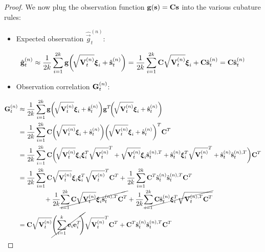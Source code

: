 \begin{proof}
		We now plug the observation function \( \boldsymbol{\mathrm{g}}(\boldsymbol{\mathrm{s}}) = \boldsymbol{\mathrm{C}} \boldsymbol{\mathrm{s}} \) into the various cubature rules:
		\begin{itemize}
			\item Expected observation \( \hat{\vec{g}}_t^{(n)} \):
		\end{itemize}
		\begin{align*}
			\hat{\boldsymbol{\mathrm{g}}}_t^{(n)}
				\approx \frac{1}{2k} \sum_{i = 1}^{2k} \boldsymbol{\mathrm{g}}\bigg(\!\sqrt{\boldsymbol{\mathrm{V}}_t^{(n)}} \boldsymbol{\mathrm{\xi}}_i + \hat{\boldsymbol{\mathrm{s}}}_t^{(n)}\bigg)
				= \frac{1}{2k} \sum_{i = 1}^{2k} \boldsymbol{\mathrm{C}} \sqrt{\boldsymbol{\mathrm{V}}_t^{(n)}} \boldsymbol{\mathrm{\xi}}_i + \boldsymbol{\mathrm{C}} \hat{\boldsymbol{\mathrm{s}}}_t^{(n)}
				= \boldsymbol{\mathrm{C}} \hat{\boldsymbol{\mathrm{s}}}_t^{(n)}
		\end{align*}
		\begin{itemize}
			\item Observation correlation \( \boldsymbol{\mathrm{G}}_t^{(n)} \):
		\end{itemize}
		\begin{align*}
			\mat{G}_t^{(n)}
				&\approx \frac{1}{2k} \sum_{i = 1}^{2k} \vec{g}\bigg(\! \sqrt{\mat{V}_t^{(n)}} \vec{\xi}_i + \hat{\vec{s}}_t^{(n)}\bigg) \vec{g}^T\!\bigg(\! \sqrt{\mat{V}_t^{(n)}} \vec{\xi}_i + \hat{\vec{s}}_t^{(n)} \bigg) \\
				&= \frac{1}{2k} \sum_{i = 1}^{2k} \mat{C} \bigg(\! \sqrt{\mat{V}_t^{(n)}} \vec{\xi}_i + \hat{\vec{s}}_t^{(n)}\bigg) \bigg(\! \sqrt{\mat{V}_t^{(n)}} \vec{\xi}_i + \hat{\vec{s}}_t^{(n)}\bigg)^T \mat{C}^T \\
				&= \frac{1}{2k} \sum_{i = 1}^{2k} \mat{C} \bigg(\! \sqrt{\mat{V}_t^{(n)}} \vec{\xi}_i \vec{\xi}_i^T \sqrt{\mat{V}_t^{(n)}}^T + \sqrt{\mat{V}_t^{(n)}} \vec{\xi}_i \hat{\vec{s}}_t^{(n), T} + \hat{\vec{s}}_t^{(n)} \vec{\xi}_i^T \sqrt{\mat{V}_t^{(n)}}^T + \hat{\vec{s}}_t^{(n)} \hat{\vec{s}}_t^{(n), T} \bigg) \mat{C}^T \\
				&= \frac{1}{2k} \sum_{i = 1}^{2k} \mat{C} \sqrt{\mat{V}_t^{(n)}} \vec{\xi}_i \vec{\xi}_i^T \sqrt{\mat{V}_t^{(n)}}^T \mat{C}^T + \frac{1}{2k} \sum_{i = 1}^{2k} \mat{C}^T \hat{\vec{s}}_t^{(n)} \hat{\vec{s}}_t^{(n), T} \mat{C}^T \\
					&\qquad\qquad + \frac{1}{2k} \cancel{\sum_{i = 1}^{2k} \mat{C} \sqrt{\mat{V}_t^{(n)}} \vec{\xi}_i \hat{\vec{s}}_t^{(n), T} \mat{C}^T} + \frac{1}{2k} \cancel{\sum_{i = 1}^{2k} \mat{C} \hat{\vec{s}}_t^{(n)} \vec{\xi}_i^T \sqrt{\mat{V}_t^{(n), T} \mat{C}^T}} \\
				&= \mat{C} \sqrt{\mat{V}_t^{(n)}} \cancel{\Bigg(\! \sum_{i = 1}^{k} \vec{e}_i \vec{e}_i^T \!\Bigg)} \sqrt{\mat{V}_t^{(n)}}^T \mat{C}^T + \mat{C}^T \hat{\vec{s}}_t^{(n)} \hat{\vec{s}}_t^{(n), T} \mat{C}^T \\

\end{align*}
\end{proof}
